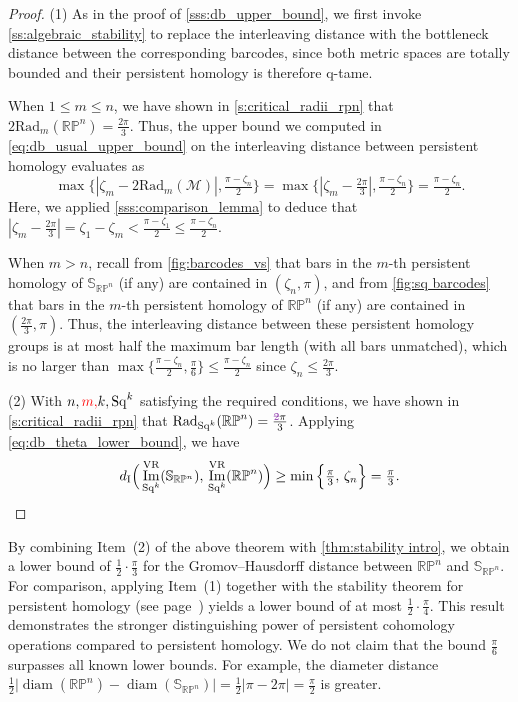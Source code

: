 \documentclass{amsart}
\theoremstyle{definition}
\newcommand{\cM}{\mathcal{M}}
\newcommand{\bS}{\mathbb{S}}
\newcommand{\VR}{\mathrm{VR}}
\newcommand{\Sq}{\mathrm{Sq}}
\theoremstyle{theorem}
\DeclareMathOperator{\img}{Im}
\newcommand{\rp}{\mathbb{RP}}
\newcommand{\di}{d_{\mathrm{I}}}
\newcommand{\firstdeath}[2]{\mathrm{Rad}_{#1}(#2)}
\newcommand{\oldmath}[1]{{\color{deletedpurple}\mathpalette\horizontalstrike{#1}}}
\newcommand{\horizontalstrike}[2]{\sbox0{$#1#2$}\rlap{\raisebox{.5\ht0}{\rule{\wd0}{.4pt}}}\usebox0}
\newcommand{\newmath}[1]{{\color{red}#1}}
\begin{document}
\begin{proof}
	(1)
	As in the proof of \cref{sss:db_upper_bound}, we first invoke \cref{ss:algebraic_stability} to replace the interleaving distance with the bottleneck distance between the corresponding barcodes, since both metric spaces are totally bounded and their persistent homology is therefore q-tame.

	When $1 \leq m \leq n$, we have shown in \cref{s:critical_radii_rpn} that
	$2\firstdeath{m}{\rp^n} = \tfrac{2\pi}{3}$.
	Thus, the upper bound we computed in \cref{eq:db_usual_upper_bound} on the interleaving distance between persistent homology evaluates as
	\[\max\big\{|\zeta_m - 2\firstdeath{m}{\cM} |, \tfrac{\pi - \zeta_n}{2}\big\} =
	\max \big\{ |\zeta_m - \tfrac{2\pi}{3} |, \tfrac{\pi - \zeta_n}{2} \big\}
	= \tfrac{\pi - \zeta_n}{2}.
	\]
	Here, we applied \cref{sss:comparison_lemma} to deduce that $|\zeta_m - \tfrac{2\pi}{3}| = \zeta_1 - \zeta_m < \tfrac{\pi - \zeta_1}{2} \leq \tfrac{\pi - \zeta_n}{2}$.

	When $m > n$, recall from \cref{fig:barcodes_vs} that bars in the $m$-th persistent homology of $\bS_{\rp^n}$ (if any) are contained in $(\zeta_n, \pi)$, and from \cref{fig:sq barcodes} that bars in the $m$-th persistent homology of $\rp^n$ (if any) are contained in $(\tfrac{2\pi}{3}, \pi)$.
	Thus, the interleaving distance between these persistent homology groups is at most half the maximum bar length (with all bars unmatched), which is no larger than $\max\{\tfrac{\pi - \zeta_n}{2}, \tfrac{\pi}{6}\} \leq \tfrac{\pi - \zeta_n}{2}$ since $\zeta_n \leq \tfrac{2\pi}{3}$.

	(2) With $n,\newmath{m,}k,\Sq^k$ satisfying the required conditions, we have shown in \cref{s:critical_radii_rpn} that
	$\firstdeath{\Sq^k}{\rp^n} = \tfrac{\oldmath{2}\pi}{3}$.
	Applying \cref{eq:db_theta_lower_bound}, we have
	\[\di\Big(\img_{\Sq^k}^\VR(\bS_{\rp^n}),\, \img_{\Sq^k}^\VR(\rp^n)\Big)
	\geq \min\Big\{\tfrac{\pi}{3},\, \zeta_n\Big\}
	= \tfrac{\pi}{3}.\qedhere
	\]
\end{proof}


By combining Item~(2) of the above theorem with \cref{thm:stability intro}, we obtain a lower bound of \(\frac{1}{2}\cdot\frac{\pi}{3}\) for the Gromov--Hausdorff distance between \(\rp^n\) and \(\bS_{\rp^n}\).
For comparison, applying Item~(1) together with the stability theorem for persistent homology (see page~\pageref{thm:stability ph}) yields a lower bound of at most \(\frac{1}{2}\cdot\frac{\pi}{4}\).
This result demonstrates the stronger distinguishing power of persistent cohomology operations compared to persistent homology.
We do not claim that the bound \(\frac{\pi}{6}\) surpasses all known lower bounds.
For example, the diameter distance \(\frac{1}{2} \lvert \operatorname{diam}(\rp^n) - \operatorname{diam}(\bS_{\rp^n}) \rvert = \frac{1}{2} \lvert \pi - 2\pi \rvert = \frac{\pi}{2}\) is greater.


	\sloppy
	\printbibliography
\end{document}
